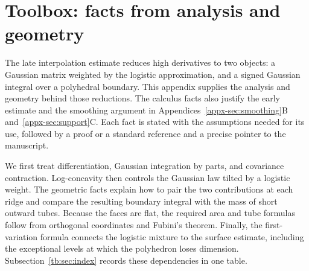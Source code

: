 %   

\makeatletter
\providecommand{\E}{\mathbb E}
\providecommand{\Pp}{\mathbb P}
\providecommand{\R}{\mathbb R}
\providecommand{\tr}{\operatorname{tr}}
\providecommand{\op}{\mathrm{op}}
\providecommand{\norm}[1]{\left\lVert#1\right\rVert}
\providecommand{\ind}{\mathbf 1}
\providecommand{\dd}{\,d}
\providecommand{\Hh}{H_2}
\providecommand{\surf}{\mathcal J}
\providecommand{\relint}{\operatorname{relint}}
\providecommand{\aff}{\operatorname{aff}}
\providecommand{\cone}{\operatorname{cone}}
\providecommand{\dist}{\operatorname{dist}}
\providecommand{\prj}{\operatorname{pr}}
\providecommand{\Haus}{\mathcal H}
\providecommand{\TBc}[1]{[#1]}
\providecommand{\PN}[2]{\ifdefined\toolboxinpaper\ref{#1}\else#2\fi}
\providecommand{\PR}[3]{#1~\PN{#2}{#3}}
\providecommand{\PE}[2]{(\PN{#1}{#2})}
\providecommand{\usedin}[1]{\par\smallskip\noindent{\small\emph{Used in:} #1}\par\smallskip}
\makeatother

\section{Toolbox: facts from analysis and geometry}\label{app:toolbox}

The late interpolation estimate reduces high derivatives to two objects:
a Gaussian matrix weighted by the logistic approximation, and a signed
Gaussian integral over a polyhedral boundary. This appendix supplies the
analysis and geometry behind those reductions. The calculus facts also
justify the early estimate and the smoothing argument in
Appendices~\PN{appx-sec:smoothing}{B} and~\PN{appx-sec:support}{C}.
Each fact is stated with the assumptions needed for its use, followed by
a proof or a standard reference and a precise pointer to the manuscript.

We first treat differentiation, Gaussian integration by parts, and
covariance contraction. Log-concavity then controls the Gaussian law
tilted by a logistic weight. The geometric facts explain how to pair the
two contributions at each ridge and compare the resulting boundary
integral with the mass of short outward tubes. Because the faces are
flat, the required area and tube formulas follow from orthogonal
coordinates and Fubini's theorem. Finally, the first-variation formula
connects the logistic mixture to the surface estimate, including the
exceptional levels at which the polyhedron loses dimension.
Subsection~\ref{tb:sec:index} records these dependencies in one table.

